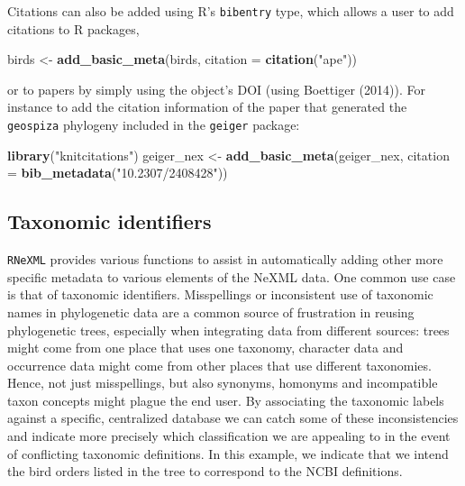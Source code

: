 \documentclass[author-year, review, 11pt]{components/elsarticle} %
\newenvironment{Shaded}{\begin{snugshade}}{\end{snugshade}}
\newcommand{\KeywordTok}[1]{\textcolor[rgb]{0.13,0.29,0.53}{\textbf{{#1}}}}
\newcommand{\DataTypeTok}[1]{\textcolor[rgb]{0.13,0.29,0.53}{{#1}}}
\newcommand{\StringTok}[1]{\textcolor[rgb]{0.31,0.60,0.02}{{#1}}}
\newcommand{\NormalTok}[1]{{#1}}
\begin{document}
Citations can also be added using R's \texttt{bibentry} type, which
allows a user to add citations to R packages,

\begin{Shaded}
\begin{Highlighting}[]
\NormalTok{birds <-}\StringTok{ }\KeywordTok{add_basic_meta}\NormalTok{(birds, }\DataTypeTok{citation =} \KeywordTok{citation}\NormalTok{(}\StringTok{"ape"}\NormalTok{))}
\end{Highlighting}
\end{Shaded}

or to papers by simply using the object's DOI (using Boettiger (2014)).
For instance to add the citation information of the paper that generated
the \texttt{geospiza} phylogeny included in the \texttt{geiger} package:

\begin{Shaded}
\begin{Highlighting}[]
\KeywordTok{library}\NormalTok{(}\StringTok{"knitcitations"}\NormalTok{)}
\NormalTok{geiger_nex <-}\StringTok{ }\KeywordTok{add_basic_meta}\NormalTok{(geiger_nex, }\DataTypeTok{citation =} \KeywordTok{bib_metadata}\NormalTok{(}\StringTok{"10.2307/2408428"}\NormalTok{))}
\end{Highlighting}
\end{Shaded}

\subsection{Taxonomic identifiers}\label{taxonomic-identifiers}

\texttt{RNeXML} provides various functions to assist in automatically
adding other more specific metadata to various elements of the NeXML
data. One common use case is that of taxonomic identifiers. Misspellings
or inconsistent use of taxonomic names in phylogenetic data are a common
source of frustration in reusing phylogenetic trees, especially when
integrating data from different sources: trees might come from one place
that uses one taxonomy, character data and occurrence data might come
from other places that use different taxonomies. Hence, not just
misspellings, but also synonyms, homonyms and incompatible taxon
concepts might plague the end user. By associating the taxonomic labels
against a specific, centralized database we can catch some of these
inconsistencies and indicate more precisely which classification we are
appealing to in the event of conflicting taxonomic definitions. In this
example, we indicate that we intend the bird orders listed in the tree
to correspond to the NCBI definitions.
\end{document}
